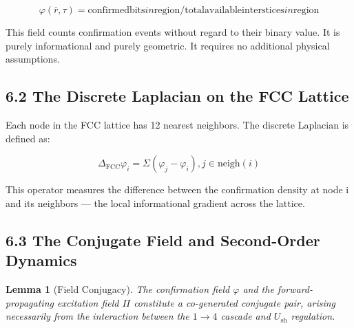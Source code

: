 \documentclass[11pt,oneside]{report}
\newtheorem{lemma}[theorem]{Lemma}
\theoremstyle{definition}
\theoremstyle{remark}
\begin{document}
\begin{equation*}
\varphi (\bar{r}, \tau ) = \text{confirmed} \text{bits} in \text{region} / \text{total} \text{available} \text{interstices}
in \text{region}
\end{equation*}

This field counts confirmation events without regard to their binary
value. It is purely informational and purely geometric. It requires no
additional physical assumptions.

\subsection*{6.2 The Discrete Laplacian on the FCC Lattice}

Each node in the FCC lattice has 12 nearest neighbors. The discrete
Laplacian is defined as:

\begin{equation*}
\Delta_{\mathrm{FCC}} \varphi_{i} = \Sigma (\varphi_{j} - \varphi_{i}), j \in \text{neigh}(i)
\end{equation*}

This operator measures the difference between the confirmation density
at node i and its neighbors --- the local informational gradient across
the lattice.

\subsection*{6.3 The Conjugate Field and Second-Order Dynamics}

\begin{lemma}[Field Conjugacy]
The confirmation field \ensuremath{\varphi} and the
forward-propagating excitation field \ensuremath{\Pi} constitute a co-generated
conjugate pair, arising necessarily from the interaction between the \ensuremath{1\to 4}
cascade and \ensuremath{U_{\mathrm{sh}}} regulation.
\end{lemma}
\end{document}
